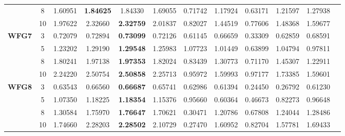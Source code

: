 \documentclass{sig-alternate}
\begin{document}
\begin{table}[!htb]
\begin{tabular}{|c|c|c|c|c|c|c|c|c|c|c|c|}
& 8          & 1.60951          & \textbf{1.84625}  & 1.84330               & 1.69055          & 0.71742             & 1.17924             & 0.63171            & 1.21597              & 1.27938          \\ \cline{2-11} 
& 10         & 1.97622          & 2.32660           & \textbf{2.32759}      & 2.01837          & 0.82027             & 1.44519             & 0.77606            & 1.48368              & 1.59677          \\ \hline
\multirow{4}{*}{\textbf{WFG7}}  & 3          & 0.72079          & 0.72894           & \textbf{0.73099}      & 0.72126          & 0.61145             & 0.66659             & 0.33309            & 0.62859              & 0.68591          \\ \cline{2-11} 
& 5          & 1.23202          & 1.29190           & \textbf{1.29548}      & 1.25983          & 1.07723             & 1.01449             & 0.63899            & 1.04794              & 0.97811          \\ \cline{2-11} 
& 8          & 1.80241          & 1.97138           & \textbf{1.97353}      & 1.82024          & 0.83439             & 1.30773             & 0.71170            & 1.45307              & 1.22911          \\ \cline{2-11} 
& 10         & 2.24220          & 2.50754           & \textbf{2.50858}      & 2.25713          & 0.95972             & 1.59993             & 0.97177            & 1.73385              & 1.59601          \\ \hline
\multirow{4}{*}{\textbf{WFG8}}  & 3          & 0.63543          & 0.66560           & \textbf{0.66687}      & 0.65741          & 0.62986             & 0.61394             & 0.24450            & 0.26792              & 0.61230          \\ \cline{2-11} 
& 5          & 1.07350          & 1.18225           & \textbf{1.18354}      & 1.15376          & 0.95660             & 0.60364             & 0.46673            & 0.82273              & 0.96648          \\ \cline{2-11} 
& 8          & 1.30584          & 1.75970           & \textbf{1.76647}      & 1.70621          & 0.30471             & 1.20786             & 0.67808            & 1.24044              & 1.28486          \\ \cline{2-11} 
& 10         & 1.74660          & 2.28203           & \textbf{2.28502}      & 2.10729          & 0.27470             & 1.60952             & 0.82704            & 1.57781              & 1.69433          \\ \hline

\end{tabular}
\end{table}
\end{document}
